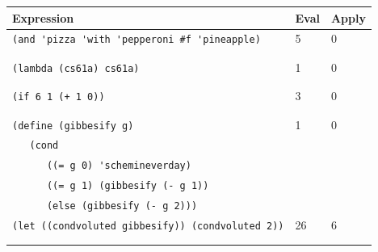 \documentclass{exam}
\begin{document}
\begin{questions}
\begin{solution}
\begin{center}
    \begin{tabular}{|m{12cm}|m{1.5cm}|m{1.5cm}|}
\hline
\textbf{Expression} & \textbf{Eval} & \textbf{Apply} \\
\hline
\lstinline$(and 'pizza 'with 'pepperoni #f 'pineapple)$ & {\color{red}5} & {\color{red}0} \\ & & \\ & &  \\
\hline
\lstinline$(lambda (cs61a) cs61a)$ & {\color{red}1} &  {\color{red}0} \\ & & \\ & & \\
\hline
\lstinline$(if 6 1 (+ 1 0))$ & {\color{red}3} & {\color{red}0} \\ & & \\ & & \\
\hline
\lstinline$(define (gibbesify g) $ & {\color{red}1} & {\color{red}0} \\
\lstinline$   (cond  $ & & \\
\lstinline$      ((= g 0) 'schemineverday)$ & & \\
\lstinline$      ((= g 1) (gibbesify (- g 1))$ & & \\
\lstinline$      (else (gibbesify (- g 2)))$ & & \\
\hline
\lstinline$(let ((condvoluted gibbesify)) (condvoluted 2))$ & {\color{red}26} & {\color{red}6}\\ & & \\ & & \\
\hline
\end{tabular}
\end{center}
\end{solution}
\end{questions}


\end{document}
